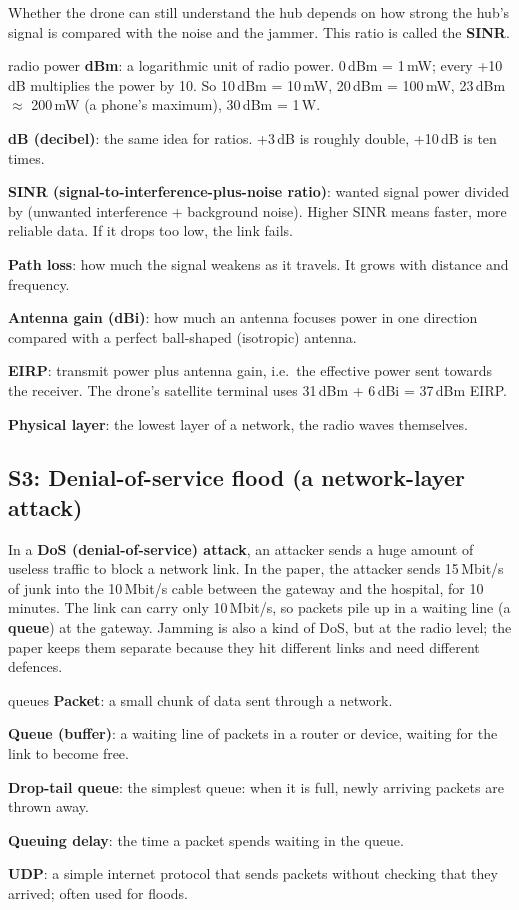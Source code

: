 \documentclass[11pt,a4paper]{article}
\newcommand{\kt}[1]{\textbf{\color{navy}#1}}
\begin{document}
Whether the drone can still understand the hub depends on how strong the hub's signal is compared with the noise and the jammer. This ratio is called the \kt{SINR}.

\begin{term}{radio power}
\kt{dBm}: a logarithmic unit of radio power. 0\,dBm = 1\,mW; every +10\,dB multiplies the power by 10. So 10\,dBm = 10\,mW, 20\,dBm = 100\,mW, 23\,dBm $\approx$ 200\,mW (a phone's maximum), 30\,dBm = 1\,W.\par
\kt{dB (decibel)}: the same idea for ratios. +3\,dB is roughly double, +10\,dB is ten times.\par
\kt{SINR (signal-to-interference-plus-noise ratio)}: wanted signal power divided by (unwanted interference + background noise). Higher SINR means faster, more reliable data. If it drops too low, the link fails.\par
\kt{Path loss}: how much the signal weakens as it travels. It grows with distance and frequency.\par
\kt{Antenna gain (dBi)}: how much an antenna focuses power in one direction compared with a perfect ball-shaped (isotropic) antenna.\par
\kt{EIRP}: transmit power plus antenna gain, i.e.\ the effective power sent towards the receiver. The drone's satellite terminal uses 31\,dBm + 6\,dBi = 37\,dBm EIRP.\par
\kt{Physical layer}: the lowest layer of a network, the radio waves themselves.
\end{term}

\subsection{S3: Denial-of-service flood (a network-layer attack)}

In a \kt{DoS (denial-of-service) attack}, an attacker sends a huge amount of useless traffic to block a network link. In the paper, the attacker sends 15\,Mbit/s of junk into the 10\,Mbit/s cable between the gateway and the hospital, for 10 minutes. The link can carry only 10\,Mbit/s, so packets pile up in a waiting line (a \kt{queue}) at the gateway. Jamming is also a kind of DoS, but at the radio level; the paper keeps them separate because they hit different links and need different defences.

\begin{term}{queues}
\kt{Packet}: a small chunk of data sent through a network.\par
\kt{Queue (buffer)}: a waiting line of packets in a router or device, waiting for the link to become free.\par
\kt{Drop-tail queue}: the simplest queue: when it is full, newly arriving packets are thrown away.\par
\kt{Queuing delay}: the time a packet spends waiting in the queue.\par
\kt{UDP}: a simple internet protocol that sends packets without checking that they arrived; often used for floods.
\end{term}
\end{document}
